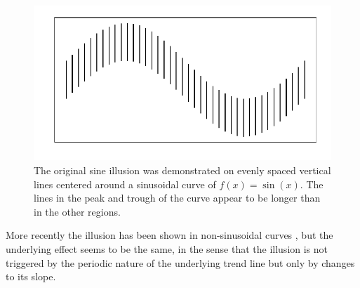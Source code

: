 \documentclass[12pt]{article}\usepackage[]{graphicx}\usepackage[]{color}
\begin{document}
\begin{figure}
\centering
\caption{The original sine illusion was demonstrated on evenly spaced vertical lines centered around a sinusoidal curve of $f(x) = \sin(x)$. The lines in the peak and trough of the curve appear to be longer than in the other regions.\label{fig:original}}
\includegraphics[keepaspectratio=true, width=.3\linewidth]{figure/fig-original}
\end{figure}
More recently the illusion has been shown in non-sinusoidal curves \citep{cleveland:1984, schonlau:2003, robbins:2005, marie:2013}, but the underlying effect seems to be the same, in the sense that the illusion is not triggered by the periodic nature of the underlying trend line but only by  changes to its slope. 
\end{document}
